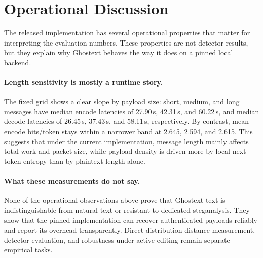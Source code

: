 \section{Operational Discussion}

The released implementation has several operational properties that matter for interpreting the evaluation numbers. These properties are not detector results, but they explain why Ghostext behaves the way it does on a pinned local backend.

\paragraph{Length sensitivity is mostly a runtime story.} The fixed grid shows a clear slope by payload size: short, medium, and long messages have median encode latencies of 27.90\,s, 42.31\,s, and 60.22\,s, and median decode latencies of 26.45\,s, 37.43\,s, and 58.11\,s, respectively. By contrast, mean encode bits/token stays within a narrower band at 2.645, 2.594, and 2.615. This suggests that under the current implementation, message length mainly affects total work and packet size, while payload density is driven more by local next-token entropy than by plaintext length alone.

\paragraph{What these measurements do not say.} None of the operational observations above prove that Ghostext text is indistinguishable from natural text or resistant to dedicated steganalysis. They show that the pinned implementation can recover authenticated payloads reliably and report its overhead transparently. Direct distribution-distance measurement, detector evaluation, and robustness under active editing remain separate empirical tasks.
